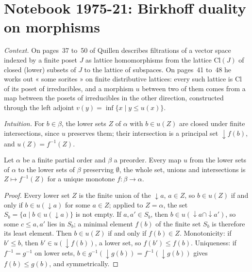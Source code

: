 \section[Notebook 1975-21: Birkhoff duality on morphisms]{Notebook 1975-21: Birkhoff duality on morphisms\protect{}}\label{sec:quillen-1975-21}

\emph{Context.} On pages~37 to~50 of  Quillen describes filtrations of a vector space indexed by a finite poset $J$ as lattice homomorphisms from the lattice $\mathrm{Cl}(J)$ of closed (lower) subsets of $J$ to the lattice of subspaces. On pages~41 to~48 he works out « some sorites » on finite distributive lattices: every such lattice is $\mathrm{Cl}$ of its poset of irreducibles, and a morphism $u$ between two of them comes from a map between the posets of irreducibles in the other direction, constructed through the left adjoint $v(y) = \inf\{x \mid y \le u(x)\}$.

\emph{Intuition.} For $b \in \beta$, the lower sets $Z$ of $\alpha$ with $b \in u(Z)$ are closed under finite intersections, since $u$ preserves them; their intersection is a principal set ${\downarrow}f(b)$, and $u(Z) = f^{-1}(Z)$.

\begin{encadre}
\begin{theoreme}\label{thm:quillen-1975-21}
Let $\alpha$ be a finite partial order and $\beta$ a preorder. Every map $u$ from the lower sets of $\alpha$ to the lower sets of $\beta$ preserving $\emptyset$, the whole set, unions and intersections is $Z \mapsto f^{-1}(Z)$ for a unique monotone $f \colon \beta \to \alpha$.
\end{theoreme}
\end{encadre}

\begin{proof}
Every lower set $Z$ is the finite union of the ${\downarrow}a$, $a \in Z$, so $b \in u(Z)$ if and only if $b \in u({\downarrow}a)$ for some $a \in Z$; applied to $Z = \alpha$, the set $S_b = \{a \mid b \in u({\downarrow}a)\}$ is not empty. If $a, a' \in S_b$, then $b \in u({\downarrow}a \cap {\downarrow}a')$, so some $c \le a, a'$ lies in $S_b$; a minimal element $f(b)$ of the finite set $S_b$ is therefore its least element. Then $b \in u(Z)$ if and only if $f(b) \in Z$. Monotonicity: if $b' \le b$, then $b' \in u({\downarrow}f(b))$, a lower set, so $f(b') \le f(b)$. Uniqueness: if $f^{-1} = g^{-1}$ on lower sets, $b \in g^{-1}({\downarrow}g(b)) = f^{-1}({\downarrow}g(b))$ gives $f(b) \le g(b)$, and symmetrically.
\end{proof}


